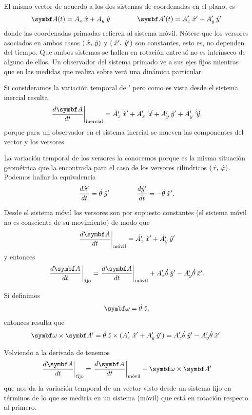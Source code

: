 \documentclass[10pt,oneside]{CBFT_book}
\begin{document}
El mismo vector de acuerdo a los dos sistemas de coordenadas en el plano, es
\[
	\vb{A}(t) = A_x\xver + A_y\yver         \qquad\qquad               \vb{A}'(t) = A_x'\xver' + A_y'\yver'
\]
donde las coordenadas primadas refieren al sistema móvil. Nótese que los versores asociados en ambos casos $(\:\hat{x}, 
\:\hat{y})$ y $(\:\hat{x}', \:\hat{y}')$ son constantes, esto es, no dependen del tiempo. Que ambos sistemas se hallen en rotación 
entre sí no es intrínseco de alguno de ellos.
Un observador del sistema primado ve a sus ejes fijos mientras que en las medidas que realiza sobre  verá una 
dinámica particular. 

Si consideramos la variación temporal de ' pero como es vista desde el sistema inercial resulta 
\[
	\left. \dtot{\vb{A}}{t} \right|_\text{inercial} = 
	\dot{A_x'} \xver' + A_x'\dot{\xver'} + \dot{A_y'}\yver' + A_y' \dot{\yver'},
\]
porque para un observador en el sistema inercial se mueven las componentes del vector y los versores.


La variación temporal de los versores la conocemos porque es la misma situación geométrica que la encontrada para el 
caso de los versores cilíndricos $(\:\hat{r},\:\hat{\varphi})$. Podemos hallar la equivalencia
\[
	\frac{d^{\hspace{-0.05em}} {\hat{x}'}}{d {t}^{\hspace{-0.05em}}} = \dot{\theta} \:\hat{y}'         \qquad \qquad          \frac{d^{\hspace{-0.05em}} {\hat{y}'}}{d {t}^{\hspace{-0.05em}}} = -\dot{\theta} \:\hat{x}'.
\]

Desde el sistema móvil los versores son por supuesto constantes (el sistema móvil no es consciente de su movimiento) de 
modo que 
\[
	\left. \dtot{\vb{A}}{t} \right|_\text{móvil} = \dot{A_x'}\xver' + \dot{A_y'}\yver'
\]
y entonces
\[
	\left. \dtot{\vb{A}}{t} \right|_\text{fijo} = \left. \dtot{\vb{A}}{t} \right|_\text{móvil}
	+ A_x' \dot{\theta}\yver' - A_y'\dot{\theta}\xver'.
\]

Si definimos
\[
	\vb{\omega} = \dot{\theta} \zver,
\]
entonces resulta que
\[
	\vb{\omega}\times\vb{A}' = \dot{\theta} \zver \times ({A_x'}\xver' + {A_y'}\yver') =
	A_x' \dot{\theta}\yver' - A_y'\dot{\theta}\xver'.
\]

Volviendo a la derivada de  tenemos
\[
	\left. \dtot{\vb{A}}{t} \right|_\text{fijo} = \left. \dtot{\vb{A}}{t} \right|_\text{móvil}
	+ \vb{\omega} \times \vb{A}'
\]
que nos da la variación temporal de un vector  visto desde un sistema fijo en términos de lo que se mediría
en un sistema (móvil) que está en rotación respecto al primero.
\end{document}
